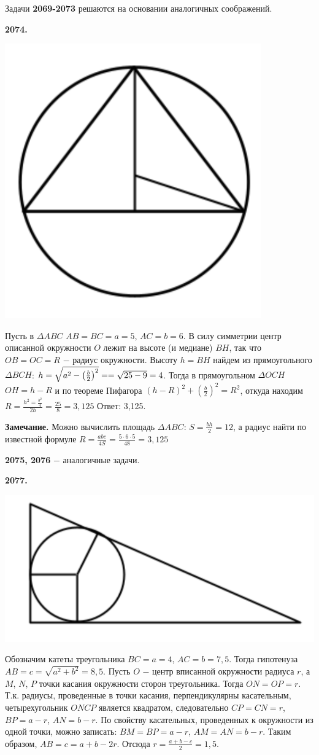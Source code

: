 Задачи \textbf{2069-2073}  решаются на основании аналогичных соображений.

\textbf{2074.}

{\centering \includegraphics[width=0.35\linewidth]{Geometry/Content/37.png}
	
}

Пусть в $\Delta ABC$ $AB = BC = a = 5$, $AC = b = 6$. В силу симметрии центр описанной окружности $O$ лежит на  высоте (и медиане) $BH$, так что  $OB=OC=R$ $-$ радиус окружности. Высоту $h = BH$ найдем из прямоугольного $\Delta BCH$: $h = \sqrt{a^2-\left( \frac{b}{2} \right)^2} = \linebreak=\sqrt{25-9} = 4$. Тогда в прямоугольном $\Delta OCH$ $OH = h - R$ и по теореме Пифагора $(h - R)^2 + \left( \frac{b}{2} \right)^2 = R^2$, откуда находим $R = \frac{h^2  =\frac{b^2}{4}}{2h} = \frac{25}{8} = 3,125$ \newline \null \hspace*{\fill} Ответ: 3,125.

\textbf{Замечание.} Можно вычислить площадь $\Delta ABC$: $S = \frac{bh}{2}=12$, а радиус 
найти по известной формуле $R = \frac{abc}{4S} = \frac{5\cdot6\cdot5}{48} = 3,125$

\textbf{2075, 2076} $-$ аналогичные задачи.

\textbf{2077.}

{\centering \includegraphics[width=0.5\linewidth]{Geometry/Content/38.png}
	
}

Обозначим  катеты треугольника $BC = a= 4$, $AC = b = 7,5$. Тогда гипотенуза $AB = c = \sqrt{a^2 + b^2} = 8,5$.  Пусть $O$ $-$ центр вписанной окружности радиуса $r$, а $M$, $N$, $P$ точки касания окружности сторон треугольника. Тогда $ON = OP = r$. Т.к. радиусы, проведенные в точки касания, перпендикулярны касательным, четырехугольник $ONCP$ является квадратом, следовательно $CP = CN = r$, $BP = a - r$, $AN = b - r$. По свойству касательных, проведенных к окружности из одной точки, можно записать: $BM = BP = a- r$, $AM = AN = b - r$. Таким образом, $AB = c = a + b - 2r$. Отсюда $r = \frac{a + b - c}{2} = 1,5$.

